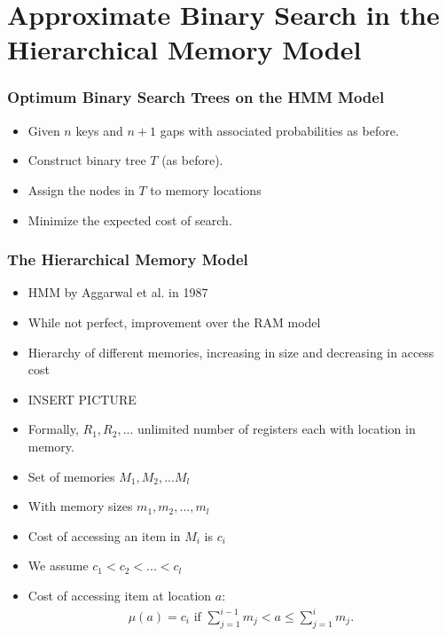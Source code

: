 \documentclass{beamer}
\theoremstyle{plain}
\begin{document}
\section{Approximate Binary Search in the Hierarchical Memory Model}\label{Approximate Binary Search in the Hierarchical Memory Model} 

\begin{frame} \frametitle{Optimum Binary Search Trees on the HMM Model}
\begin{itemize}
\item Given $n$ keys and $n+1$ gaps with associated probabilities as before.  
\item Construct binary tree $T$ (as before).
\item Assign the nodes in $T$ to memory locations
\item Minimize the expected cost of search.
\end{itemize}
\end{frame}
 
\begin{frame} \frametitle{The Hierarchical Memory Model}\label{The Hierarchical Memory Model}

\begin{itemize}

\item HMM by Aggarwal et al. in 1987
\item While not perfect, improvement over the RAM model
\item Hierarchy of different memories, increasing in size and decreasing in access cost
\item INSERT PICTURE

\end{itemize}
\end{frame}

\begin{frame}
\begin{itemize}
\item Formally, $R_1, R_2, ...$ unlimited number of registers each with location in memory.
\item Set of memories $M_1, M_2, ...M_l$
\item With memory sizes $m_1, m_2, ..., m_l$
\item Cost of accessing an item in $M_i$ is $c_i$
\item We assume $c_1 < c_2 < ... < c_l$
\item Cost of accessing item at location $a$:
\begin{align*}
\mu (a) = c_i \text{ if } \sum_{j = 1}^{i-1}m_j  < a \leq \sum_{j = 1}^{i}m_j.
\end{align*}
\end{itemize}
\end{frame}
\end{document}
